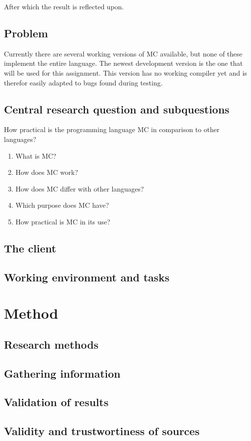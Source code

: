 After which the result is reflected upon.

\section{Problem}
Currently there are several working versions of MC available, but none of these implement the entire language.
The newest development version is the one that will be used for this assignment.
This version has no working compiler yet and is therefor easily adapted to bugs found during testing.

\section{Central research question and subquestions}
How practical is the programming language MC in comparison to other languages?
\begin{enumerate}
   \item What is MC?
   \item How does MC work?
   \item How does MC differ with other languages?
   \item Which purpose does MC have?
   \item How practical is MC in its use?
\end{enumerate}
\section{The client}
\section{Working environment and tasks}

\chapter{Method}
\section{Research methods}
\section{Gathering information}
\section{Validation of results}
\section{Validity and trustwortiness of sources}
